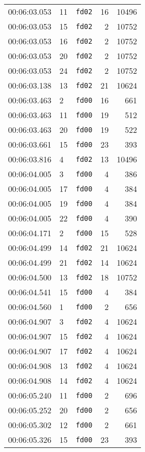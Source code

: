 \documentclass{article}
\begin{document}
\begin{longtable}{lllrr}
00:06:03.053 & 11 & \texttt{fd02} & 16 & 10496 \\
00:06:03.053 & 15 & \texttt{fd02} & 2 & 10752 \\
00:06:03.053 & 16 & \texttt{fd02} & 2 & 10752 \\
00:06:03.053 & 20 & \texttt{fd02} & 2 & 10752 \\
00:06:03.053 & 24 & \texttt{fd02} & 2 & 10752 \\
00:06:03.138 & 13 & \texttt{fd02} & 21 & 10624 \\
00:06:03.463 & 2 & \texttt{fd00} & 16 & 661 \\
00:06:03.463 & 11 & \texttt{fd00} & 19 & 512 \\
00:06:03.463 & 20 & \texttt{fd00} & 19 & 522 \\
00:06:03.661 & 15 & \texttt{fd00} & 23 & 393 \\
00:06:03.816 & 4 & \texttt{fd02} & 13 & 10496 \\
00:06:04.005 & 3 & \texttt{fd00} & 4 & 386 \\
00:06:04.005 & 17 & \texttt{fd00} & 4 & 384 \\
00:06:04.005 & 19 & \texttt{fd00} & 4 & 384 \\
00:06:04.005 & 22 & \texttt{fd00} & 4 & 390 \\
00:06:04.171 & 2 & \texttt{fd00} & 15 & 528 \\
00:06:04.499 & 14 & \texttt{fd02} & 21 & 10624 \\
00:06:04.499 & 21 & \texttt{fd02} & 14 & 10624 \\
00:06:04.500 & 13 & \texttt{fd02} & 18 & 10752 \\
00:06:04.541 & 15 & \texttt{fd00} & 4 & 384 \\
00:06:04.560 & 1 & \texttt{fd00} & 2 & 656 \\
00:06:04.907 & 3 & \texttt{fd02} & 4 & 10624 \\
00:06:04.907 & 15 & \texttt{fd02} & 4 & 10624 \\
00:06:04.907 & 17 & \texttt{fd02} & 4 & 10624 \\
00:06:04.908 & 13 & \texttt{fd02} & 4 & 10624 \\
00:06:04.908 & 14 & \texttt{fd02} & 4 & 10624 \\
00:06:05.240 & 11 & \texttt{fd00} & 2 & 696 \\
00:06:05.252 & 20 & \texttt{fd00} & 2 & 656 \\
00:06:05.302 & 12 & \texttt{fd00} & 2 & 661 \\
00:06:05.326 & 15 & \texttt{fd00} & 23 & 393 \\

\end{longtable}
\end{document}
